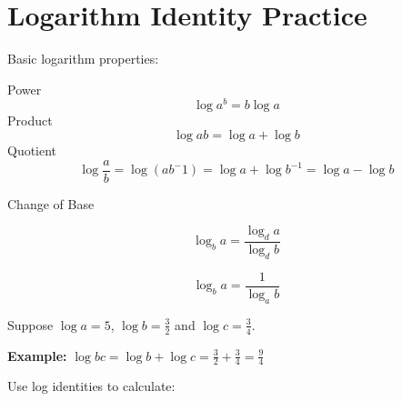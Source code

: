 \section*{Logarithm Identity Practice}
Basic logarithm properties:

Power
$$\log a^b= b\log a$$
Product
$$\log ab = \log a + \log b$$
Quotient
$$\log \frac{a}{b} = \log (ab^-1) = \log a + \log b^{-1} = \log a - \log b$$

Change of Base

$$\log_b a = \frac{\log_d a}{\log_d b}$$

$$\log_b a = \frac{1}{\log_a b}$$

\begin{questions}

\question

Suppose $\log a=5$, $\log b=\frac{3}{2}$ and $\log c=\frac{3}{4}$. 

\textbf{Example:} $\log bc = \log b + \log c = \frac{3}{2} + \frac{3}{4}= \frac{9}{4}$

Use log identities to calculate:

\end{questions}
